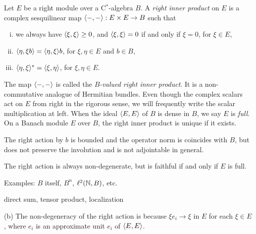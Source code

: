 \documentclass{../../large}
\begin{document}
\begin{prb}
Let $E$ be a right module over a C$^*$-algebra $B$.
A \emph{right inner product} on $E$ is a complex sesquilinear map $\langle-,-\rangle:E\times E\to B$ such that
\begin{enumerate}[(i)]
\item we always have $\langle\xi,\xi\rangle\ge0$, and $\langle\xi,\xi\rangle=0$ if and only if $\xi=0$, for $\xi\in E$,
\item $\langle\eta,\xi b\rangle=\langle\eta,\xi\rangle b$, for $\xi,\eta\in E$ and $b\in B$,
\item $\langle\eta,\xi\rangle^*=\langle\xi,\eta\rangle$, for $\xi,\eta\in E$.
\end{enumerate}
The map $\langle-,-\rangle$ is called the \emph{$B$-valued right inner product}.
It is a non-commutative analogue of Hermitian bundles.
Even though the complex scalars act on $E$ from right in the rigorous sense, we will frequently write the scalar multiplication at left.
When the ideal $\langle E,E\rangle$ of $B$ is dense in $B$, we say $E$ is \emph{full}.
On a Banach module $E$ over $B$, the right inner product is unique if it exists.
\begin{parts}
\item The right action by $b$ is bounded and the operator norm is coincides with $B$, but does not preserve the involution and is not adjointable in general.
\item The right action is always non-degenerate, but is faithful if and only if $E$ is full.
\item Examples: $B$ itself, $B^n$, $\ell^2(\mathbb{N},B)$, etc.
\item direct sum, tensor product, localization
\end{parts}
\end{prb}
\begin{pf}

(b)
The non-degeneracy of the right action is because $\xi e_i\to\xi$ in $E$ for each $\xi\in E$, where $e_i$ is an approximate unit $e_i$ of $\langle E,E\rangle$.
\end{pf}
\end{document}
